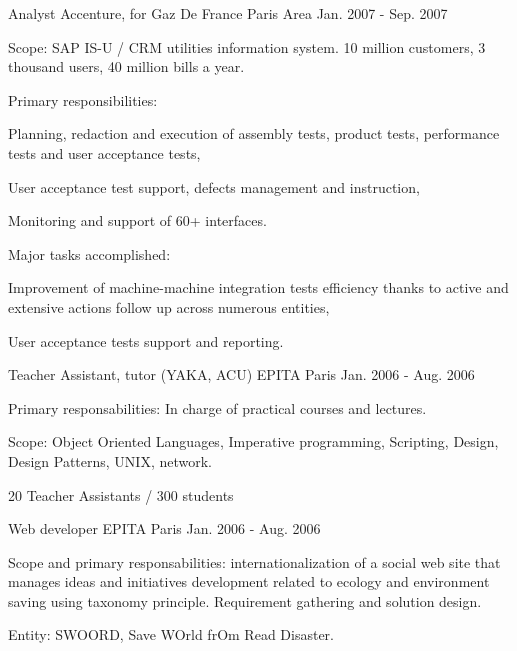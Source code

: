 \begin{cventries}
  \cventry
    {Analyst} %
    {Accenture, for Gaz De France} %
    {Paris Area} %
    {Jan. 2007 - Sep. 2007} %
    {
      \begin{cvitems} %
        \item {Scope: SAP IS-U / CRM utilities information system. 10 million customers, 3 thousand users, 40 million bills a year.}
        \item {Primary responsibilities:}
        \begin{cvsubitems}
          \item {Planning, redaction and execution of assembly tests, product tests, performance tests and user acceptance tests,}
          \item {User acceptance test support, defects management and instruction,}
          \item {Monitoring and support of 60+ interfaces.}
        \end{cvsubitems}
        \item {Major tasks accomplished:}
        \begin{cvsubitems}
          \item {Improvement of machine-machine integration tests efficiency thanks to active and extensive actions follow up across numerous entities,}
          \item {User acceptance tests support and reporting.}
        \end{cvsubitems}
      \end{cvitems}
    }

  \cventry
    {Teacher Assistant, tutor (YAKA, ACU)} %
    {EPITA} %
    {Paris} %
    {Jan. 2006 - Aug. 2006} %
    {
      \begin{cvitems} %
        \item {Primary responsabilities: In charge of practical courses and lectures.}
        \item {Scope: Object Oriented Languages, Imperative programming, Scripting, Design, Design Patterns, UNIX, network.}
        \item {20 Teacher Assistants / 300 students}
      \end{cvitems}
    }

  \cventry
    {Web developer} %
    {EPITA} %
    {Paris} %
    {Jan. 2006 - Aug. 2006} %
    {
      \begin{cvitems} %
        \item {Scope and primary responsabilities: internationalization of a social web site that manages ideas and initiatives development related to ecology and environment saving using taxonomy principle. Requirement gathering and solution design.}
        \item {Entity: SWOORD, Save WOrld frOm Read Disaster.}
      \end{cvitems}
    }


\end{cventries}
